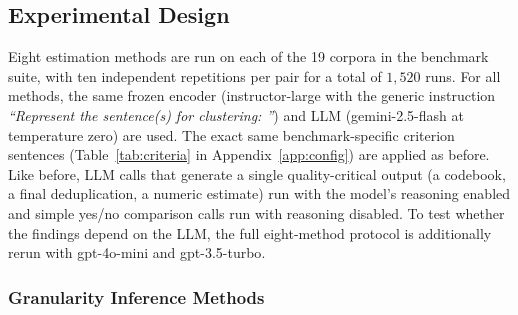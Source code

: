 \documentclass[11pt,a4paper,oneside]{report}
\begin{document}
\subsection{Experimental Design}\label{sec:RQ2_DESIGN}

Eight estimation methods are run on each of the 19 corpora in the benchmark suite, with ten independent repetitions per pair for a total of $1{,}520$ runs. For all methods, the same frozen encoder ({\small\ttfamily instructor-large} with the generic instruction \emph{``Represent the sentence(s) for clustering: ''}) and LLM ({\small\ttfamily gemini-2.5-flash} at temperature zero) are used. The exact same benchmark-specific criterion sentences (Table~\ref{tab:criteria} in Appendix~\ref{app:config}) are applied as before. Like before, LLM calls that generate a single quality-critical output (a codebook, a final deduplication, a numeric estimate) run with the model's reasoning enabled and simple yes/no comparison calls run with reasoning disabled. To test whether the findings depend on the LLM, the full eight-method protocol is additionally rerun with {\small\ttfamily gpt-4o-mini} and {\small\ttfamily gpt-3.5-turbo}.

\subsubsection{Granularity Inference Methods}
\end{document}
